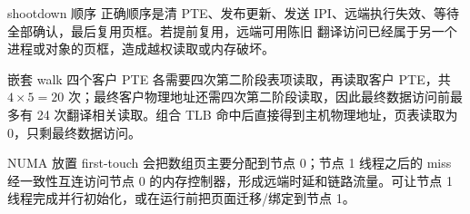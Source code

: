 \begin{chapteranswer}{shootdown 顺序}
正确顺序是清 PTE、发布更新、发送 IPI、远端执行失效、等待全部确认，最后复用页框。若提前复用，远端可用陈旧  翻译访问已经属于另一个进程或对象的页框，造成越权读取或内存破坏。
\end{chapteranswer}

\begin{chapteranswer}{嵌套 walk}
四个客户 PTE 各需要四次第二阶段表项读取，再读取客户 PTE，共 $4\times5=20$ 次；最终客户物理地址还需四次第二阶段读取，因此最终数据访问前最多有 24 次翻译相关读取。组合 TLB 命中后直接得到主机物理地址，页表读取为 0，只剩最终数据访问。
\end{chapteranswer}

\begin{chapteranswer}{NUMA 放置}
first-touch 会把数组页主要分配到节点 0；节点 1 线程之后的 miss 经一致性互连访问节点 0 的内存控制器，形成远端时延和链路流量。可让节点 1 线程完成并行初始化，或在运行前把页面迁移/绑定到节点 1。
\end{chapteranswer}
